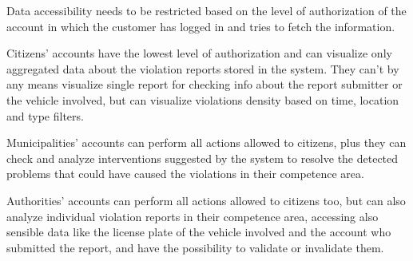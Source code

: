 Data accessibility needs to be restricted based on the level of authorization of the account in which the customer has logged in and tries to fetch the information.

Citizens' accounts have the lowest level of authorization and can visualize only aggregated data about the violation reports stored in the system. They can't by any means visualize single report for checking info about the report submitter or the vehicle involved, but can visualize violations density based on time, location and type filters.

Municipalities' accounts can perform all actions allowed to citizens, plus they can check and analyze interventions suggested by the system to resolve the detected problems that could have caused the violations in their competence area.

Authorities' accounts can perform all actions allowed to citizens too, but can also analyze individual violation reports in their competence area, accessing also sensible data like the license plate of the vehicle involved and the account who submitted the report, and have the possibility to validate or invalidate them.